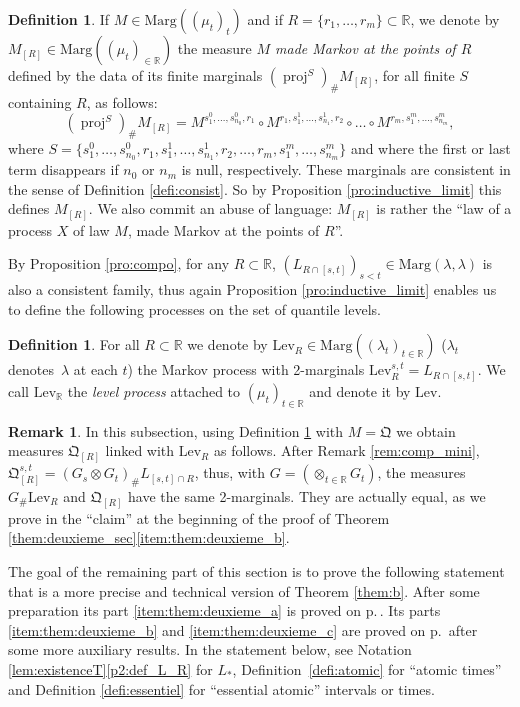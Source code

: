 \documentclass[11pt]{article}
\theoremstyle{plain}
\theoremstyle{definition}
\newtheorem{defi}[them]{Definition}
\newtheorem{rem}[them]{Remark}
\newcommand{\como}{\mathfrak{Q}}
\newcommand{\lev}{\mathrm{Lev}}
\newcommand{\la}{\lambda}
\newcommand{\ma}{\mathrm{Marg}}
\newcommand{\R}{\mathbb{R}}
\newcommand{\pr}{\operatorname{proj}}
\begin{document}
\begin{defi}\label{defi:quantile_discretement_markovien} If $M\in\ma((\mu_t)_t)$ and if $R=\{r_1,\ldots,r_m\}\subset\R$, we denote by $M_{[R]}\in\ma((\mu_t)_{\in\R})$ the measure \emph{$M$ made Markov at the points of $R$} defined by the data of its finite marginals $(\pr^{S})_\# M_{[R]}$, for all finite $S$ containing $R$, as follows:
\[(\pr^{S})_\# M_{[R]}= M^{s^0_1,\ldots, s^0_{n_0},r_1}\circ M^{r_1,s^1_{1},\ldots,s^1_{n_1},r_2}\circ\ldots\circ M^{r_m,s^m_{1},\ldots,s^m_{n_m}},\]
where $S=\{s^0_1,\ldots, s^0_{n_0},r_1,s^1_{1},\ldots,s^1_{n_1},r_2,\ldots,r_m,s^m_{1},\ldots,s^m_{n_m}\}$ and where the first or last term disappears if $n_0$ or $n_m$ is null, respectively. These marginals are consistent in the sense of Definition \ref{defi:consist}. So by Proposition \ref{pro:inductive_limit} this defines $M_{[R]}$. We also commit an abuse of language: $M_{[R]}$ is rather the ``law of a process $X$ of law $M$, made Markov at the points of $R$''.
\end{defi}

By Proposition \ref{pro:compo}, for any $R\subset\R$, $(L_{R\cap[s,t]})_{s<t}\in \ma(\la,\la)$ is also a consistent family, thus again Proposition \ref{pro:inductive_limit} enables us to define the following processes on the set of quantile levels.

\begin{defi}\label{defi:lev}
For all $R\subset\R$ we denote by $\lev_R\in\ma((\la_t)_{t\in\R})$ ($\la_t$ denotes~$\la$ at each $t$) the Markov process with 2-marginals $\lev_R^{s,t}=L_{R\cap[s,t]}$. We call $\lev_\R$ the \emph{level process} attached to $(\mu_t)_{t\in \R}$ and denote it by $\lev$.
\end{defi}

\begin{rem}\label{rem:mini_et_Q}In this subsection, using Definition \ref{defi:quantile_discretement_markovien} with $M=\como$ we obtain measures $\como_{[R]}$ linked with $\lev_R$ as follows. After Remark \ref{rem:comp_mini}, $\como_{[R]}^{s,t}=(G_s\otimes G_t)_\#L_{[s,t]\cap R}$, thus, with $G=(\otimes_{t\in \R} G_{t})$, the measures $G_\#\lev_R$ and $\como_{[R]}$ have the same 2-marginals. They are actually equal, as we prove in the ``claim'' at the beginning of the proof of Theorem \ref{them:deuxieme_sec}\eqref{item:them:deuxieme_b}.
\end{rem}

The goal of the remaining part of this section is to prove the following statement that is a more precise and technical version of Theorem \ref{them:b}. After some preparation its part \eqref{item:them:deuxieme_a} is proved on p.\,\pageref{proof:themBa}. Its parts \eqref{item:them:deuxieme_b} and \eqref{item:them:deuxieme_c} are proved on p.\,\pageref{proof:them:deuxieme} after some more auxiliary results. In the statement below, see Notation \ref{lem:existenceT}\eqref{p2:def_L_R} for $L_\ast$, Definition~\ref{defi:atomic} for ``atomic times'' and Definition \ref{defi:essentiel} for ``essential atomic'' intervals or times.
\end{document}

